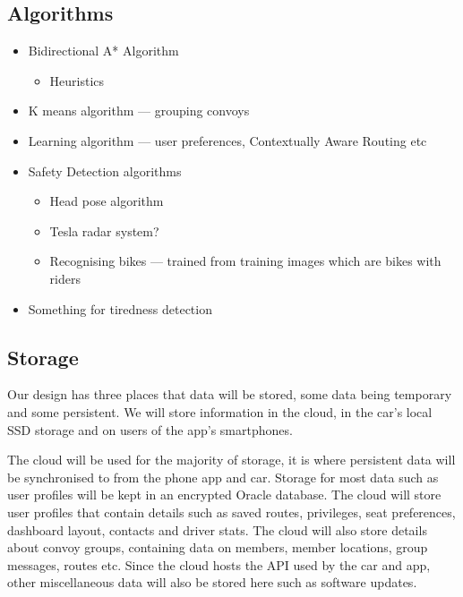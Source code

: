 \documentclass{article}
\begin{document}
\subsection{Algorithms}\label{ssec:algorithms}
\begin{itemize}
  \item Bidirectional A* Algorithm
    \begin{itemize}
      \item Heuristics
    \end{itemize}
  \item K means algorithm --- grouping convoys
  \item Learning algorithm --- user preferences, Contextually Aware Routing etc
  \item Safety Detection algorithms
    \begin{itemize}
      \item Head pose algorithm
      \item Tesla radar system?
      \item Recognising bikes --- trained from training images which are bikes with riders
    \end{itemize}
  \item Something for tiredness detection
\end{itemize}

\subsection{Storage}\label{ssec:storage} %
Our design has three places that data will be stored, some data being temporary and some persistent. We will store information in the cloud, in the car's local SSD storage and on users of the app's smartphones.

The cloud will be used for the majority of storage, it is where persistent data will be synchronised to from the phone app and car. Storage for most data such as user profiles will be kept in an encrypted Oracle database. The cloud will store user profiles that contain details such as saved routes, privileges, seat preferences, dashboard layout, contacts and driver stats. The cloud will also store details about convoy groups, containing data on members, member locations, group messages, routes etc. Since the cloud hosts the API used by the car and app, other miscellaneous data will also be stored here such as software updates.
\end{document}
